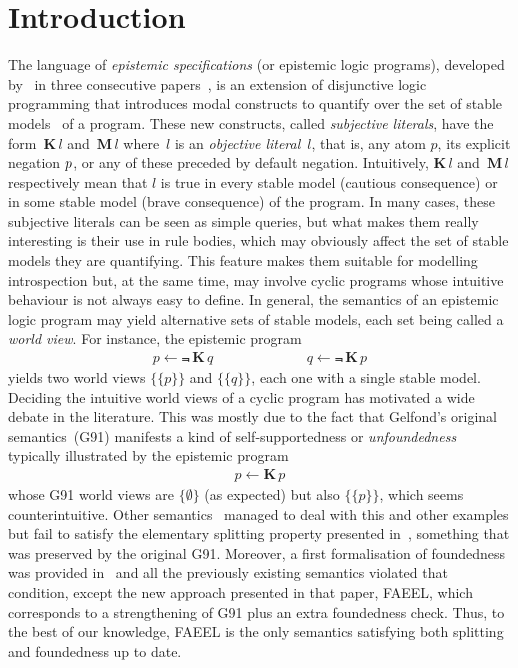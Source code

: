 \documentclass{new_tlp}
\def\K{\mathbf{K}\, }
\def\M{\mathbf{M}\, }
\let\sneg\relax
\newcommand{\sneg}{\ensuremath{\text{-}}}
\begin{document}
\section{Introduction}
\label{sec:intro}

The language of \emph{epistemic specifications}  (or epistemic logic programs), developed by~ in three consecutive papers~\cite{gelfond91a,GelfondP93,gelfond94},
is an extension of disjunctive logic programming that introduces modal constructs to quantify over the set of stable models~\cite{gellif88b} of a program.
%
These new constructs, called \emph{subjective literals}, have the form~$\K l$ and~$\M l$ where~$l$ is an \emph{objective literal}~$l$, that is, any atom $p$, its explicit negation $\sneg p$, or any of these preceded by default negation.
%
Intuitively, $\K l$ and~$\M l$ respectively mean that $l$ is true in every stable model (cautious consequence) or in some stable model (brave consequence) of the program.
%
In many cases, these subjective literals can be seen as simple queries, but what makes them really interesting is their use in rule bodies,
which may obviously affect the set of stable models they are quantifying.
%
This feature makes them suitable for modelling introspection but, at the same time, may involve cyclic programs whose intuitive behaviour is not always easy to define.
%
In general, the semantics of an epistemic logic program may yield alternative sets of stable models, each set being called a \emph{world view}.
%
For instance, the epistemic program
\begin{eqnarray}
p \leftarrow \Not \, \K q \hspace{80pt}
q \leftarrow \Not \, \K p  \label{f:epiloop}
\end{eqnarray}
%
yields two world views $\{\{p\}\}$ and $\{\{q\}\}$, each one with a single stable model.
%
Deciding the intuitive world views of a cyclic program has motivated a wide debate in the literature.
%
This was mostly due to the fact that Gelfond's original \mbox{semantics (G91)} manifests a kind of self-supportedness or \emph{unfoundedness} typically illustrated by the epistemic program
\begin{eqnarray}
p \leftarrow \K p \label{f:selfsupport}
\end{eqnarray}
whose G91 world views are $\{\emptyset\}$ (as expected) but also $\{\{p\}\}$, which seems counterintuitive.
%
Other semantics~\cite{kawabagezh15,faheir15a,sheeit17a} managed to deal with this and other examples but fail to satisfy the elementary splitting property presented in~\cite{cafafa19a}, something that was preserved by the original G91.
%
Moreover, a first formalisation of foundedness was provided in~\cite{cafafa19b} and all the previously existing semantics violated that condition, except the new approach presented in that paper, FAEEL, which corresponds to a strengthening of G91 plus an extra foundedness check.
%
Thus, to the best of our knowledge, FAEEL is the only semantics satisfying both splitting and foundedness up to date.
\end{document}
